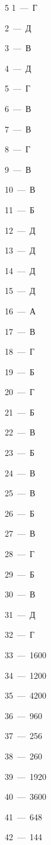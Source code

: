 \documentclass[12pt]{article}
\begin{document}
\begin{multicols}{5}\noindent
\mbox{1~--- Г}\par
\mbox{2~--- Д}\par
\mbox{3~--- В}\par
\mbox{4~--- Д}\par
\mbox{5~--- Г}\par
\mbox{6~--- В}\par
\mbox{7~--- В}\par
\mbox{8~--- Г}\par
\mbox{9~--- В}\par
\mbox{10~--- В}\par
\mbox{11~--- Б}\par
\mbox{12~--- Д}\par
\mbox{13~--- Д}\par
\mbox{14~--- Д}\par
\mbox{15~--- Д}\par
\mbox{16~--- А}\par
\mbox{17~--- В}\par
\mbox{18~--- Г}\par
\mbox{19~--- Б}\par
\mbox{20~--- Г}\par
\mbox{21~--- Б}\par
\mbox{22~--- В}\par
\mbox{23~--- Б}\par
\mbox{24~--- В}\par
\mbox{25~--- В}\par
\mbox{26~--- Б}\par
\mbox{27~--- В}\par
\mbox{28~--- Г}\par
\mbox{29~--- Б}\par
\mbox{30~--- В}\par
\mbox{31~--- Д}\par
\mbox{32~--- Г}\par
\mbox{33~--- 1600}\par
\mbox{34~--- 1200}\par
\mbox{35~--- 4200}\par
\mbox{36~--- 960}\par
\mbox{37~--- 256}\par
\mbox{38~--- 260}\par
\mbox{39~--- 1920}\par
\mbox{40~--- 3600}\par
\mbox{41~--- 648}\par
\mbox{42~--- 144}\par

\end{multicols}
\end{document}
